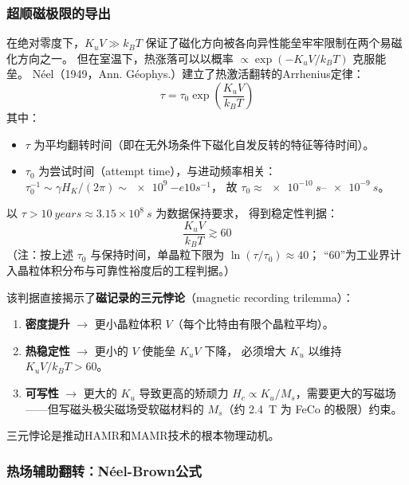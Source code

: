 \documentclass[11pt,a4paper,twoside]{article}
\theoremstyle{definition}
\theoremstyle{plain}
\theoremstyle{remark}
\begin{document}
\subsubsection{超顺磁极限的导出}

在绝对零度下，$K_u V \gg k_B T$ 保证了磁化方向被各向异性能垒牢牢限制在两个易磁化方向之一。
但在室温下，热涨落可以以概率 $\propto \exp(-K_u V / k_B T)$ 克服能垒。
N\'{e}el（1949，Ann. G\'{e}ophys.）建立了热激活翻转的Arrhenius定律：
\begin{equation}\label{eq:neel}
  \boxed{ \tau = \tau_0 \exp\!\left( \frac{K_u V}{k_B T} \right) }
\end{equation}
其中：
\begin{itemize}
  \item $\tau$ 为平均翻转时间（即在无外场条件下磁化自发反转的特征等待时间）。
  \item $\tau_0$ 为尝试时间（attempt time），与进动频率相关：
  $\tau_0^{-1} \sim \gamma H_K / (2\pi) \sim \SI{e9}{-e10}{s^{-1}}$，
  故 $\tau_0 \approx \SIrange{e-10}{e-9}{s}$。
\end{itemize}

以 $\tau > \SI{10}{years} \approx 3.15 \times 10^8\ \si{s}$ 为数据保持要求，
得到稳定性判据：
\begin{equation}\label{eq:stability-criterion}
  \boxed{ \frac{K_u V}{k_B T} \gtrsim 60 }
\end{equation}
（注：按上述 $\tau_0$ 与保持时间，单晶粒下限为 $\ln(\tau/\tau_0) \approx 40$；
``60''为工业界计入晶粒体积分布与可靠性裕度后的工程判据。）

该判据直接揭示了\textbf{磁记录的三元悖论}（magnetic recording trilemma）：

\begin{enumerate}
  \item \textbf{密度提升} $\rightarrow$ 更小晶粒体积 $V$（每个比特由有限个晶粒平均）。
  \item \textbf{热稳定性} $\rightarrow$ 更小的 $V$ 使能垒 $K_u V$ 下降，
  必须增大 $K_u$ 以维持 $K_u V / k_B T > 60$。
  \item \textbf{可写性} $\rightarrow$ 更大的 $K_u$ 导致更高的矫顽力
  $H_c \propto K_u / M_s$，需要更大的写磁场——但写磁头极尖磁场受软磁材料的
  $M_s$（约 \SI{2.4}{T} 为 FeCo 的极限）约束。
\end{enumerate}

三元悖论是推动HAMR和MAMR技术的根本物理动机。

\subsubsection{热场辅助翻转：N\'{e}el-Brown公式}
\end{document}
